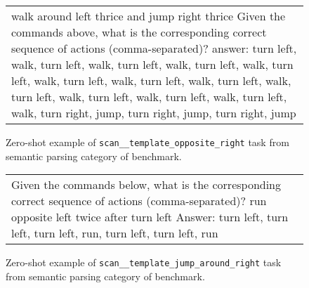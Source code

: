 \begin{figure}[h]
\centering
\begin{tabular}{p{}}
\cellcolor{oldlace} walk around left thrice and jump right thrice\vspace{1pt} \newline \vspace{1pt} \newline Given the commands above, what is the corresponding correct sequence of actions (comma-separated)?\vspace{1pt} \newline answer: \textcolor{cadmiumgreen}{turn left, walk, turn left, walk, turn left, walk, turn left, walk, turn left, walk, turn left, walk, turn left, walk, turn left, walk, turn left, walk, turn left, walk, turn left, walk, turn left, walk, turn right, jump, turn right, jump, turn right, jump} \\
\end{tabular}
\caption{Zero-shot example of \texttt{scan\_\_template\_opposite\_right} task from semantic parsing category of \promptsource benchmark.}
\end{figure}




\begin{figure}[h]
\centering
\begin{tabular}{p{}}
\cellcolor{oldlace} Given the commands below, what is the corresponding correct sequence of actions (comma-separated)?\vspace{1pt} \newline \vspace{1pt} \newline run opposite left twice after turn left\vspace{1pt} \newline Answer: \textcolor{cadmiumgreen}{turn left, turn left, turn left, run, turn left, turn left, run} \\
\end{tabular}
\caption{Zero-shot example of \texttt{scan\_\_template\_jump\_around\_right} task from semantic parsing category of \promptsource benchmark.}
\end{figure}




